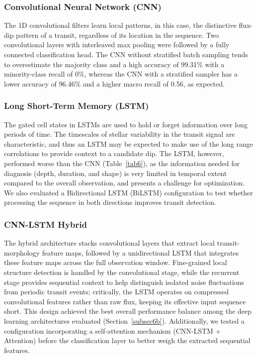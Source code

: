 \documentclass[preprint,11pt,times]{elsarticle}
\begin{document}
\subsubsection{Convolutional Neural Network (CNN)}\label{subsubsec4b2}

The 1D convolutional filters learn local patterns, in this case, the distinctive flux-dip pattern of a transit, regardless of its location in the sequence. Two convolutional layers with interleaved max pooling were followed by a fully connected classification head. The CNN without stratified batch sampling tends to overestimate the majority class and a high accuracy of 99.31\% with a minority-class recall of 0\%, whereas the CNN with a stratified sampler has a lower accuracy of 96.46\% and a higher macro recall of 0.56, as expected.

\subsubsection{Long Short-Term Memory (LSTM)}\label{subsubsec4b3}

The gated cell states in LSTMs are used to hold or forget information over long periods of time. The timescales of stellar variability in the transit signal are characteristic, and thus an LSTM may be expected to make use of the long range correlations to provide context to a candidate dip. The LSTM, however, performed worse than the CNN (Table~\ref{tab6}), as the information needed for diagnosis (depth, duration, and shape) is very limited in temporal extent compared to the overall observation, and presents a challenge for optimization. We also evaluated a Bidirectional LSTM (BiLSTM) configuration to test whether processing the sequence in both directions improves transit detection.

\subsubsection{CNN-LSTM Hybrid}\label{subsubsec4b4}

The hybrid architecture stacks convolutional layers that extract local transit-morphology feature maps, followed by a unidirectional LSTM that integrates these feature maps across the full observation window. Fine-grained local structure detection is handled by the convolutional stage, while the recurrent stage provides sequential context to help distinguish isolated noise fluctuations from periodic transit events; critically, the LSTM operates on compressed convolutional features rather than raw flux, keeping its effective input sequence short. This design achieved the best overall performance balance among the deep learning architectures evaluated (Section~\ref{subsec6b}). Additionally, we tested a configuration incorporating a self-attention mechanism (CNN-LSTM + Attention) before the classification layer to better weigh the extracted sequential features.
\end{document}
